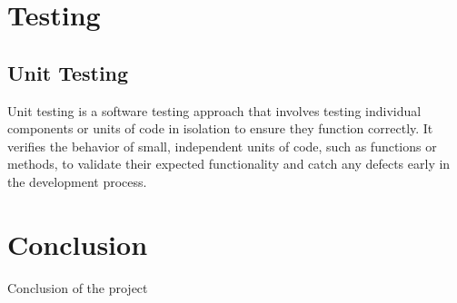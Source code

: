 \chapter{Testing}
\section{Unit Testing}
Unit testing is a software testing approach that involves testing individual components or units of code in isolation to ensure they function correctly. It verifies the behavior of small, independent units of code, such as functions or methods, to validate their expected functionality and catch any defects early in the development process. \cite{Hamilton23}

\chapter{Conclusion}
Conclusion of the project